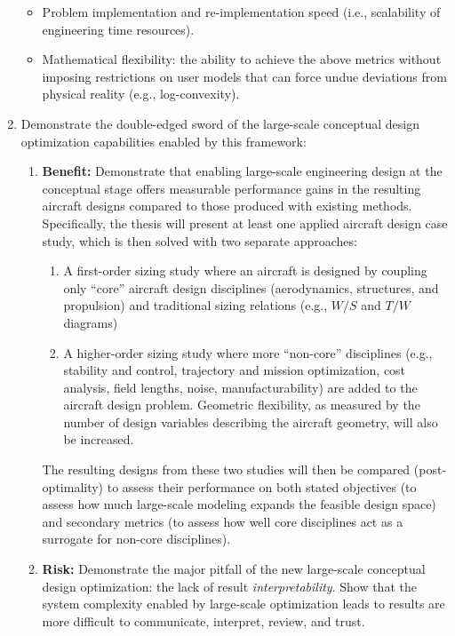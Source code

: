 \documentclass[12pt,vi,oneside]{report}
\begin{document}
\begin{enumerate}
\begin{itemize}
            \item Problem implementation and re-implementation speed (i.e., scalability of engineering time resources).
            \item Mathematical flexibility: the ability to achieve the above metrics without imposing restrictions on user models that can force undue deviations from physical reality (e.g., log-convexity).
        \end{itemize}
        \item Demonstrate the double-edged sword of the large-scale conceptual design optimization capabilities enabled by this framework:
        \begin{enumerate}
            \item \textbf{Benefit:} Demonstrate that enabling large-scale engineering design at the conceptual stage offers measurable performance gains in the resulting aircraft designs compared to those produced with existing methods. Specifically, the thesis will present at least one applied aircraft design case study, which is then solved with two separate approaches:
            \begin{enumerate}
                \item A first-order sizing study where an aircraft is designed by coupling only ``core'' aircraft design disciplines (aerodynamics, structures, and propulsion) and traditional sizing relations (e.g., $W/S$ and $T/W$ diagrams)
                \item A higher-order sizing study where more ``non-core'' disciplines (e.g., stability and control, trajectory and mission optimization, cost analysis, field lengths, noise, manufacturability) are added to the aircraft design problem. Geometric flexibility, as measured by the number of design variables describing the aircraft geometry, will also be increased.
            \end{enumerate}
            The resulting designs from these two studies will then be compared (post-optimality) to assess their performance on both stated objectives (to assess how much large-scale modeling expands the feasible design space) and secondary metrics (to assess how well core disciplines act as a surrogate for non-core disciplines).
            \item \textbf{Risk:} Demonstrate the major pitfall of the new large-scale conceptual design optimization: the lack of result \textit{interpretability}. Show that the system complexity enabled by large-scale optimization leads to results are more difficult to communicate, interpret, review, and trust.

\end{enumerate}
\end{enumerate}
\end{document}
